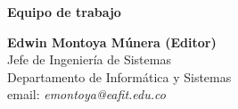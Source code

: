 \begin{center}
\textbf{\Huge Equipo de trabajo}
\end{center}
\vspace{1cm}

\begin{center}
\textbf{Edwin Montoya Múnera (Editor)}\\
Jefe de Ingeniería de Sistemas \\
Departamento de Informática y Sistemas \\
email: \textit{emontoya@eafit.edu.co}\\
\end{center}

\newpage
